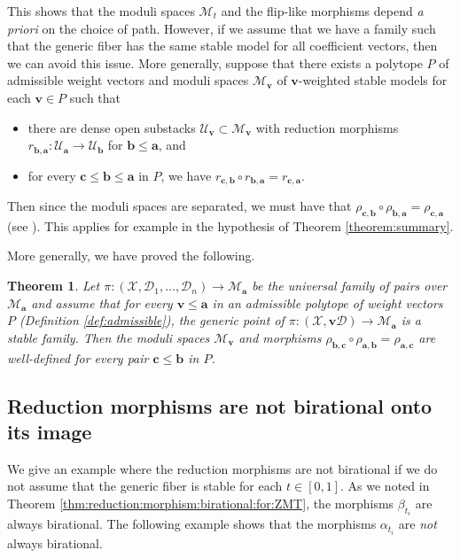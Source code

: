 \documentclass[11pt]{amsart}
\newtheorem{theorem}{Theorem}[section]
\theoremstyle{definition}
\theoremstyle{remark}
\newcommand{\calU}{\mathcal U}
\newcommand{\calX}{\mathcal X}
\newcommand{\calD}{\mathcal D}
\newcommand{\sM}{\mathscr{M}}
\newcommand{\bfa}{\mathbf{a}}
\newcommand{\bfv}{\mathbf{v}}
\newcommand{\bfb}{\mathbf{b}}
\newcommand{\bfc}{\mathbf{c}}
\begin{document}
	This shows that the moduli spaces $\sM_t$ and the flip-like morphisms depend \emph{a priori} on the choice of path. However, if we assume that we have a family such that the generic fiber has the same stable model for all coefficient vectors, then we can avoid this issue. More generally, suppose that there exists a polytope $P$ of admissible weight vectors and moduli spaces $\sM_{\bfv}$ of $\bfv$-weighted stable models for each $\bfv \in P$ such that 
	\begin{itemize} 
		\item there are dense open substacks $\calU_{\bfv} \subset \sM_{\bfv}$ with reduction morphisms $r_{\bfb, \bfa} : \calU_{\bfa} \to \calU_{\bfb}$ for $\bfb \le \bfa$, and
		\item for every $\bfc \le \bfb \le \bfa$ in $P$, we have $r_{\bfc, \bfb} \circ r_{\bfb, \bfa} = r_{\bfc, \bfa}$.
	\end{itemize}
	Then since the moduli spaces are separated, we must have that $\rho_{\bfc, \bfb} \circ \rho_{\bfb, \bfa} = \rho_{\bfc, \bfa}$ (see \cite[Lemma 7.2]{DH18}). This applies for example in the hypothesis of Theorem \ref{theorem:summary}.
	
	
	
	More generally, we have proved the following. 
	\begin{theorem}\label{thm:last:thm}
		Let $\pi : (\calX,\calD_1,...,\calD_n) \to \sM_{\bfa}$ be the universal family of pairs over $\sM_{\bfa}$ and assume that for every $\mathbf{v} \le \bfa$ in an admissible polytope of weight vectors $P$ (Definition \ref{def:admissible}), the generic point of $\pi : (\calX,\mathbf{v}\calD) \to \sM_{\bfa}$ is a stable family. Then the moduli spaces $\sM_{\mathbf{v}}$ and morphisms $\rho_{\mathbf{b},\mathbf{c}} \circ \rho_{\mathbf{a},\mathbf{b}}=\rho_{\mathbf{a},\mathbf{c}}$ are well-defined for every pair $\mathbf{c}\le \mathbf{b}$ in $P$.
	\end{theorem}
	
	\subsection{Reduction morphisms are not birational onto its image}\label{sec:notbirationa}
	
	
	We give an example where the reduction morphisms are not birational if we do not assume that the generic fiber is stable for each $t \in [0,1]$. As we noted in Theorem \ref{thm:reduction:morphism:birational:for:ZMT}, the morphisms $\beta_{t_i}$ are always birational. The following example shows that the morphisms $\alpha_{t_i}$ are \emph{not} always birational.
	
\end{document}
